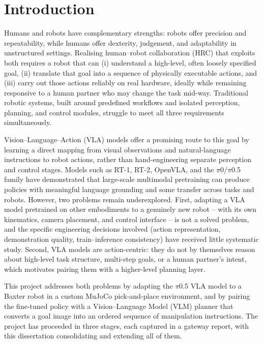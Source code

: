 \documentclass[12pt]{article}
\begin{document}
\begin{abstract}
Project updates, demonstrations, and source code are available at \texttt{https://saniya2912.github.io/pi05-baxter/}.
\end{abstract}

\clearpage

\section{Introduction}
\label{sec:intro}

Humans and robots have complementary strengths: robots offer precision and repeatability, while humans offer dexterity, judgement, and adaptability in unstructured settings. Realising human--robot collaboration (HRC) that exploits both requires a robot that can (i) understand a high-level, often loosely specified goal, (ii) translate that goal into a sequence of physically executable actions, and (iii) carry out those actions reliably on real hardware, ideally while remaining responsive to a human partner who may change the task mid-way. Traditional robotic systems, built around predefined workflows and isolated perception, planning, and control modules, struggle to meet all three requirements simultaneously.

Vision--Language--Action (VLA) models offer a promising route to this goal by learning a direct mapping from visual observations and natural-language instructions to robot actions, rather than hand-engineering separate perception and control stages. Models such as RT-1, RT-2, OpenVLA, and the $\pi$0/$\pi$0.5 family have demonstrated that large-scale multimodal pretraining can produce policies with meaningful language grounding and some transfer across tasks and robots. However, two problems remain underexplored. First, adapting a VLA model pretrained on other embodiments to a genuinely new robot -- with its own kinematics, camera placement, and control interface -- is not a solved problem, and the specific engineering decisions involved (action representation, demonstration quality, train--inference consistency) have received little systematic study. Second, VLA models are action-centric: they do not by themselves reason about high-level task structure, multi-step goals, or a human partner's intent, which motivates pairing them with a higher-level planning layer.

This project addresses both problems by adapting the $\pi$0.5 VLA model to a Baxter robot in a custom MuJoCo pick-and-place environment, and by pairing the fine-tuned policy with a Vision--Language Model (VLM) planner that converts a goal image into an ordered sequence of manipulation instructions. The project has proceeded in three stages, each captured in a gateway report, with this dissertation consolidating and extending all of them.
\end{document}
